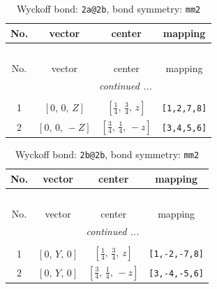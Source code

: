 \documentclass[fleqn,8pt]{jsarticle}
\begin{document}
\begin{longtable}{cccc}
\caption{Wyckoff bond: {\tt 2a@2b}, bond symmetry: {\tt mm2}}
 \\
 \hline \hline
No. & vector & center & mapping \\ \hline \endfirsthead

\multicolumn{3}{l}{\tablename\ \thetable{}} \\
 \hline \hline
No. & vector & center & mapping \\ \hline \endhead

 \hline \hline
\multicolumn{3}{r}{\footnotesize\it continued ...} \\ \endfoot

 \hline \hline
\multicolumn{3}{r}{} \\ \endlastfoot

1 & $\left[ 0,\, 0,\, Z \right]$ & $\left[ \frac{1}{4},\, \frac{3}{4},\, z \right]$ & {\tt [1,2,7,8]} \\ \hline
2 & $\left[ 0,\, 0,\, - Z \right]$ & $\left[ \frac{3}{4},\, \frac{1}{4},\, - z \right]$ & {\tt [3,4,5,6]} \\
\end{longtable}
\renewcommand{\arraystretch}{1.2}
\begin{longtable}{cccc}
\caption{Wyckoff bond: {\tt 2b@2b}, bond symmetry: {\tt mm2}}
 \\
 \hline \hline
No. & vector & center & mapping \\ \hline \endfirsthead

\multicolumn{3}{l}{\tablename\ \thetable{}} \\
 \hline \hline
No. & vector & center & mapping \\ \hline \endhead

 \hline \hline
\multicolumn{3}{r}{\footnotesize\it continued ...} \\ \endfoot

 \hline \hline
\multicolumn{3}{r}{} \\ \endlastfoot

1 & $\left[ 0,\, Y,\, 0 \right]$ & $\left[ \frac{1}{4},\, \frac{3}{4},\, z \right]$ & {\tt [1,-2,-7,8]} \\ \hline
2 & $\left[ 0,\, Y,\, 0 \right]$ & $\left[ \frac{3}{4},\, \frac{1}{4},\, - z \right]$ & {\tt [3,-4,-5,6]} \\
\end{longtable}
\renewcommand{\arraystretch}{1.2}
\end{document}
